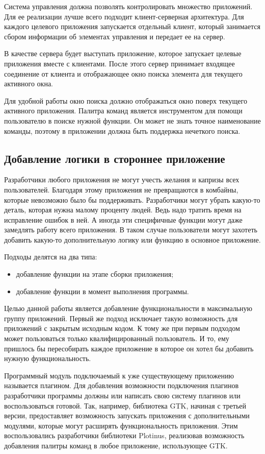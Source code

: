 Система управления должна позволять контролировать множество приложений. Для ее
реализации лучше всего подходит клиент-серверная архитектура. Для каждого
целевого приложения запускается отдельный клиент, который занимается сбором
информации об элементах управления и передает ее на сервер.

В качестве сервера будет выступать приложение, которое запускает целевые
приложения вместе с клиентами. После этого сервер принимает входящее соединение
от клиента и отображающее окно поиска элемента для текущего активного окна.

Для удобной работы окно поиска должно отображаться окно поверх текущего
активного приложения. Палитра команд является инструментом для помощи
пользователю в поиске нужной функции. Он может не знать точное наименование
команды, поэтому в приложении должна быть поддержка нечеткого поиска.

\subsection{Добавление логики в стороннее приложение}

Разработчики любого приложения не могут учесть желания и капризы всех
пользователей. Благодаря этому приложения не превращаются в комбайны, которые
невозможно было бы поддерживать. Разработчики могут убрать какую-то деталь,
которая нужна малому проценту людей. Ведь надо тратить время на исправление
ошибок в ней. А иногда эти специфичные функции могут даже замедлять работу всего
приложения. В таком случае пользователи могут захотеть добавить какую-то
дополнительную логику или функцию в основное приложение.

Подходы делятся на два типа:
\begin{itemize}
	\item добавление функции на этапе сборки приложения;
	\item добавление функции в момент выполнения программы.
\end{itemize}

Целью данной работы является добавление функциональности в максимальную группу
приложений. Первый же подход исключает такую возможность для приложений с
закрытым исходным кодом. К тому же при первым подходом может пользоваться только
квалифицированный пользователь. И то, ему пришлось бы пересобирать каждое
приложение в которое он хотел бы добавить нужную функциональность.

Программный модуль подключаемый к уже существующему приложению называется
плагином. Для добавления возможности подключения плагинов разработчики программы
должны или написать свою систему плагинов или воспользоваться готовой. Так,
например, библиотека GTK, начиная с третьей версии, предоставляет возможность
запускать приложения с дополнительными модулями, которые могут расширять
функциональность приложения. Этим воспользовались разработчики библиотеки
Plotinus, реализовав возможность добавления палитры команд в любое приложение,
использующее GTK.

